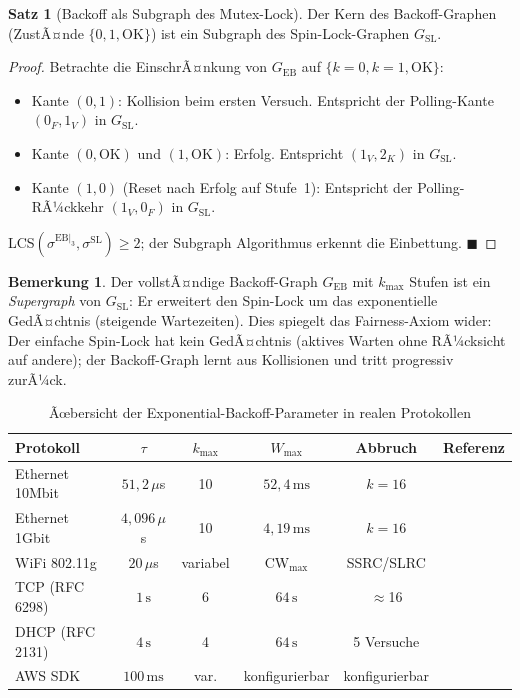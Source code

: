 ﻿\documentclass[a4paper,12pt]{article}
\theoremstyle{definition}
\newtheorem{satz}{Satz}
\newtheorem{bemerkung}{Bemerkung}
\begin{document}
\begin{satz}[Backoff als Subgraph des Mutex-Lock]
\label{satz:backoff_subgraph}
Der Kern des Backoff-Graphen (ZustÃ¤nde $\{0, 1, \mathrm{OK}\}$)
ist ein Subgraph des Spin-Lock-Graphen $G_{\mathrm{SL}}$.
\end{satz}

\begin{proof}
Betrachte die EinschrÃ¤nkung von $G_{\mathrm{EB}}$ auf
$\{k=0, k=1, \mathrm{OK}\}$:
\begin{itemize}
  \item Kante $(0, 1)$: Kollision beim ersten Versuch. Entspricht
        der Polling-Kante $(0_F, 1_V)$ in $G_{\mathrm{SL}}$.
  \item Kante $(0, \mathrm{OK})$ und $(1, \mathrm{OK})$:
        Erfolg. Entspricht $(1_V, 2_K)$ in $G_{\mathrm{SL}}$.
  \item Kante $(1, 0)$ (Reset nach Erfolg auf Stufe~1):
        Entspricht der Polling-RÃ¼ckkehr $(1_V, 0_F)$ in
        $G_{\mathrm{SL}}$.
\end{itemize}
LCS$(\sigma^{\mathrm{EB}|_3}, \sigma^{\mathrm{SL}}) \geq 2$;
der Subgraph Algorithmus erkennt die Einbettung.
\hfill$\blacksquare$
\end{proof}

\begin{bemerkung}
Der vollstÃ¤ndige Backoff-Graph $G_{\mathrm{EB}}$ mit $k_{\max}$
Stufen ist ein \emph{Supergraph} von $G_{\mathrm{SL}}$: Er erweitert
den Spin-Lock um das exponentielle GedÃ¤chtnis (steigende Wartezeiten).
Dies spiegelt das Fairness-Axiom wider:
Der einfache Spin-Lock hat kein GedÃ¤chtnis (aktives Warten ohne
RÃ¼cksicht auf andere); der Backoff-Graph lernt aus Kollisionen
und tritt progressiv zurÃ¼ck.
\end{bemerkung}

\begin{table}[H]
\centering
\caption{Ãœbersicht der Exponential-Backoff-Parameter in
  realen Protokollen}
\label{tab:backoff_protokolle}
\begin{tabular}{lccccl}
  \toprule
  Protokoll & $\tau$ & $k_{\max}$ & $W_{\max}$ & Abbruch & Referenz \\
  \midrule
  Ethernet 10Mbit & $51{,}2\,\mu$s & 10 & $52{,}4\,\mathrm{ms}$ & $k=16$ & \cite{metcalfe1976ethernet} \\
  Ethernet 1Gbit & $4{,}096\,\mu$s & 10 & $4{,}19\,\mathrm{ms}$ & $k=16$ & \cite{ieee8023} \\
  WiFi 802.11g & $20\,\mu$s & variabel & CW$_{\max}$ & SSRC/SLRC & \cite{ieee80211} \\
  TCP (RFC 6298) & $1\,\mathrm{s}$ & 6 & $64\,\mathrm{s}$ & $\approx$16 & \cite{rfc6298} \\
  DHCP (RFC 2131) & $4\,\mathrm{s}$ & 4 & $64\,\mathrm{s}$ & 5 Versuche & \cite{rfc2131} \\
  AWS SDK & $100\,\mathrm{ms}$ & var. & konfigurierbar & konfigurierbar & \cite{amazon2022backoff} \\
  \bottomrule
\end{tabular}
\end{table}
\end{document}
